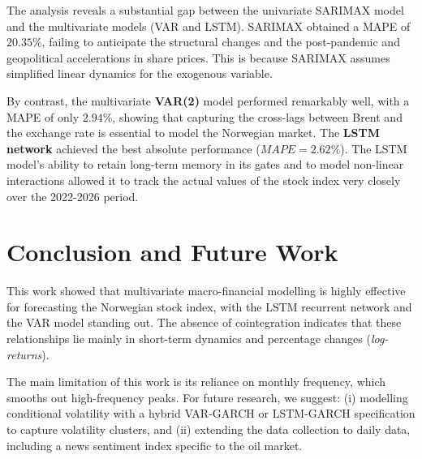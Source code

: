 \documentclass[11pt,a4paper]{article}
\begin{document}
The analysis reveals a substantial gap between the univariate SARIMAX model and the multivariate models (VAR and LSTM). SARIMAX obtained a MAPE of $20.35\%$, failing to anticipate the structural changes and the post-pandemic and geopolitical accelerations in share prices. This is because SARIMAX assumes simplified linear dynamics for the exogenous variable.

By contrast, the multivariate \textbf{VAR(2)} model performed remarkably well, with a MAPE of only $2.94\%$, showing that capturing the cross-lags between Brent and the exchange rate is essential to model the Norwegian market. The \textbf{LSTM network} achieved the best absolute performance ($MAPE = 2.62\%$). The LSTM model's ability to retain long-term memory in its gates and to model non-linear interactions allowed it to track the actual values of the stock index very closely over the 2022-2026 period.

\section{Conclusion and Future Work}
This work showed that multivariate macro-financial modelling is highly effective for forecasting the Norwegian stock index, with the LSTM recurrent network and the VAR model standing out. The absence of cointegration indicates that these relationships lie mainly in short-term dynamics and percentage changes (\textit{log-returns}).

The main limitation of this work is its reliance on monthly frequency, which smooths out high-frequency peaks. For future research, we suggest: (i) modelling conditional volatility with a hybrid VAR-GARCH or LSTM-GARCH specification to capture volatility clusters, and (ii) extending the data collection to daily data, including a news sentiment index specific to the oil market.
\end{document}
